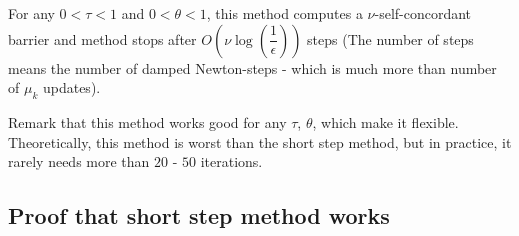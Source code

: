 \begin{theorem}
For any $0 < \tau < 1$ and $0 < \theta < 1$, this method computes a $\nu$-self-concordant barrier and method stops after $O(\nu \log(\dfrac{1}{\epsilon}))$ steps (The number of steps means the number of damped Newton-steps - which is much more than number of $\mu_k$ updates).


\end{theorem}

Remark that this method works good for any $\tau$, $\theta$, which make it flexible. Theoretically, this method is worst than the short step method, but in practice, it rarely needs more than $20$ - $50$ iterations. 

\subsection{Proof that short step method works}

